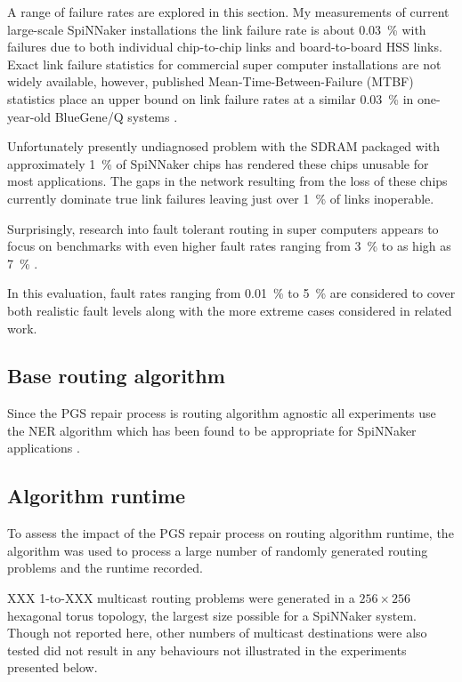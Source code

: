 			A range of failure rates are explored in this section. My measurements of
			current large-scale SpiNNaker installations the link failure rate is about
			\SI{0.03}{\percent} with failures due to both individual chip-to-chip links
			and board-to-board HSS links. Exact link failure statistics for commercial
			super computer installations are not widely available, however, published
			Mean-Time-Between-Failure (MTBF) statistics place an upper bound on link
			failure rates at a similar \SI{0.03}{\percent} in one-year-old BlueGene/Q
			systems \cite{chiu11}.
			
			Unfortunately presently undiagnosed problem with the SDRAM packaged with
			approximately \SI{1}{\percent} of SpiNNaker chips has rendered these chips
			unusable for most applications. The gaps in the network resulting from the
			loss of these chips currently dominate true link failures leaving just over
			\SI{1}{\percent} of links inoperable.
			
			Surprisingly, research into fault tolerant routing in super computers
			appears to focus on benchmarks with even higher fault rates ranging from
			\SI{3}{\percent} to as high as \SI{7}{\percent}
			\cite{ho04,gomez04,mejia06}.
			
			In this evaluation, fault rates ranging from \SI{0.01}{\percent} to
			\SI{5}{\percent} are considered to cover both realistic fault levels
			along with the more extreme cases considered in related work.
		
		\subsection{Base routing algorithm}
			
			Since the PGS repair process is routing algorithm agnostic all
			experiments use the NER algorithm which has been found to be appropriate
			for SpiNNaker applications \cite{navaridas14}.
		
		\subsection{Algorithm runtime}
			
			To assess the impact of the PGS repair process on routing algorithm
			runtime, the algorithm was used to process a large number of randomly
			generated routing problems and the runtime recorded.
			
			XXX 1-to-XXX multicast routing problems were generated in a
			$256\times256$ hexagonal torus topology, the largest size possible for a
			SpiNNaker system. Though not reported here, other numbers of multicast
			destinations were also tested did not result in any behaviours not
			illustrated in the experiments presented below.
			
